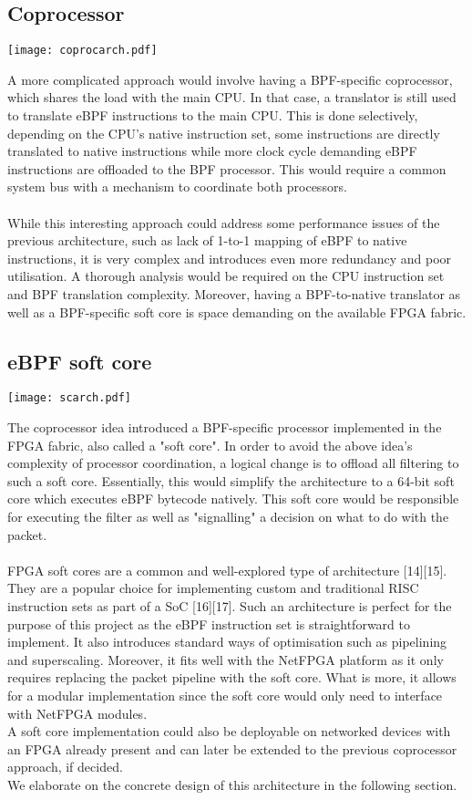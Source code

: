 \documentclass{l4proj}
\begin{document}
\subsection{Coprocessor}
\begin{center}
\texttt{[image: coprocarch.pdf]}\\
\end{center}
A more complicated approach would involve having a BPF-specific coprocessor, which shares the load with the main CPU. In that case, a translator is still used to translate eBPF instructions to the main CPU. This is done selectively, depending on the CPU's native instruction set, some instructions are directly translated to native instructions while more clock cycle demanding eBPF instructions are offloaded to the BPF processor. This would require a common system bus with a mechanism to coordinate both processors.\\\\
While this interesting approach could address some performance issues of the previous architecture, such as lack of 1-to-1 mapping of eBPF to native instructions, it is very complex and introduces even more redundancy and poor utilisation. A thorough analysis would be required on the CPU instruction set and BPF translation complexity. Moreover, having a BPF-to-native translator as well as a BPF-specific soft core is space demanding on the available FPGA fabric.
\subsection{eBPF soft core}
\begin{center}
\texttt{[image: scarch.pdf]}\\
\end{center}
The coprocessor idea introduced a BPF-specific processor implemented in the FPGA fabric, also called a "soft core". In order to avoid the above idea's complexity of processor coordination, a logical change is to offload all filtering to such a soft core. Essentially, this would simplify the architecture to a 64-bit soft core which executes eBPF bytecode natively. This soft core would be responsible for executing the filter as well as "signalling" a decision on what to do with the packet.\\\\
FPGA soft cores are a common and well-explored type of architecture [14][15]. They are a popular choice for implementing custom and traditional RISC instruction sets as part of a SoC [16][17]. Such an architecture is perfect for the purpose of this project as the eBPF instruction set is straightforward to implement. It also introduces standard ways of optimisation such as pipelining and superscaling. Moreover, it fits well with the NetFPGA platform as it only requires replacing the packet pipeline with the soft core. What is more, it allows for a modular implementation since the soft core would only need to interface with NetFPGA modules.\\
A soft core implementation could also be deployable on networked devices with an FPGA already present and can later be extended to the previous coprocessor approach, if decided.\\
We elaborate on the concrete design of this architecture in the following section.
\end{document}
